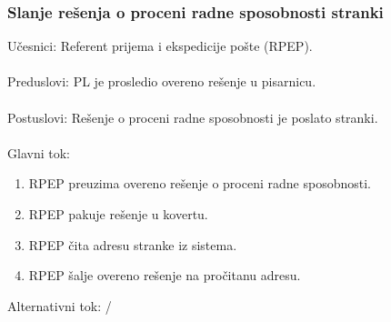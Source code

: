 \subsubsection{Slanje re\v senja o proceni radne sposobnosti stranki}
\label{su: slanje resenja o radnoj sposobnosti}

\noindent U\v cesnici: Referent prijema i ekspedicije po\v ste (RPEP).
\\
\\ Preduslovi: PL je prosledio overeno re\v senje u pisarnicu.
\\
\\ Postuslovi: Rešenje o proceni radne sposobnosti je poslato stranki.
\\
\\ Glavni tok:
\begin{enumerate}
	\item RPEP preuzima overeno re\v senje o proceni radne sposobnosti.
	\item RPEP pakuje re\v senje u kovertu.
	\item RPEP \v cita adresu stranke iz sistema.
	\item RPEP \v salje overeno re\v senje na pro\v citanu adresu.
\end{enumerate}


\noindent Alternativni tok: /

